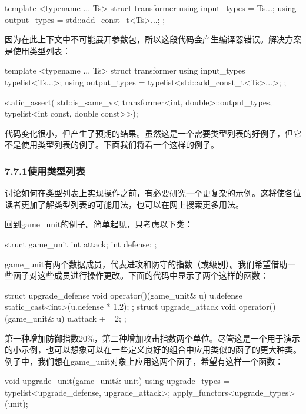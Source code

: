 \begin{cpp}
template <typename ... Ts>
struct transformer
{
	using input_types = Ts...;
	using output_types = std::add_const_t<Ts>...;
};
\end{cpp}

因为在此上下文中不可能展开参数包，所以这段代码会产生编译器错误。解决方案是使用类型列表：

\begin{cpp}
template <typename ... Ts>
struct transformer
{
	using input_types = typelist<Ts...>;
	using output_types = typelist<std::add_const_t<Ts>...>;
};

static_assert(
	std::is_same_v<
		transformer<int, double>::output_types,
		typelist<int const, double const>>);
\end{cpp}

代码变化很小，但产生了预期的结果。虽然这是一个需要类型列表的好例子，但它不是使用类型列表的例子。下面我们将看一个这样的例子。

\subsubsection{7.7.1\hspace{0.2cm}使用类型列表}

讨论如何在类型列表上实现操作之前，有必要研究一个更复杂的示例。这将使各位读者更加了解类型列表的可能用法，也可以在网上搜索更多用法。

回到game\_unit的例子。简单起见，只考虑以下类：

\begin{cpp}
struct game_unit
{
	int attack;
	int defense;
};
\end{cpp}

game\_unit有两个数据成员，代表进攻和防守的指数（或级别）。我们希望借助一些函子对这些成员进行操作更改。下面的代码中显示了两个这样的函数：

\begin{cpp}
struct upgrade_defense
{
	void operator()(game_unit& u)
	{
		u.defense = static_cast<int>(u.defense * 1.2);
	}
};
struct upgrade_attack
{
	void operator()(game_unit& u)
	{
		u.attack += 2;
	}
};
\end{cpp}

第一种增加防御指数20\%，第二种增加攻击指数两个单位。尽管这是一个用于演示的小示例，也可以想象可以在一些定义良好的组合中应用类似的函子的更大种类。例子中，我们想在game\_unit对象上应用这两个函子，希望有这样一个函数：

\begin{cpp}
void upgrade_unit(game_unit& unit)
{
	using upgrade_types =
		typelist<upgrade_defense, upgrade_attack>;
	apply_functors<upgrade_types>{}(unit);
}
\end{cpp}

